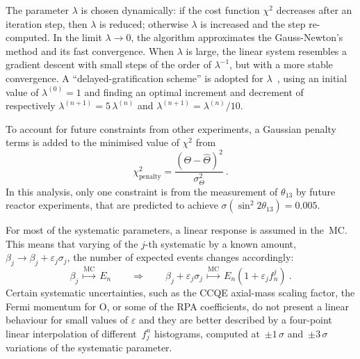 The parameter $\lambda$ is chosen dynamically: if the cost function $\chi^2$ decreases %
after an iteration step, then $\lambda$ is reduced; otherwise $\lambda$ is increased and the step re-computed.
In the limit $\lambda \to 0$, the algorithm approximates the Gauss-Newton's method and its fast convergence.
When $\lambda$ is large, the linear system resembles a gradient descent with small steps of the order of $\lambda^{-1}$, %
but with a more stable convergence.
A ``delayed-gratification scheme'' is adopted for $\lambda$~\cite{Transtrum2012}, using an initial value of $\lambda^{(0)} = 1$ and finding %
an optimal increment and decrement of respectively $\lambda^{(n+1)} = 5\,\lambda^{(n)}$ and $\lambda^{(n+1)} = \lambda^{(n)} / 10$.

To account for future constraints from other experiments, a Gaussian penalty terms is added %
to the minimised value of $\chi^2$ from 
\begin{equation}
	\chi^2_\text{penalty} = \frac{(\Theta - \hat{\Theta})^2}{\sigma_\Theta^2}\ .
\end{equation}
In this analysis, only one constraint is from the measurement of $\theta_{13}$ by future reactor experiments, %
that are predicted to achieve $\sigma(\sin^2 2\theta_{13}) = 0.005$.

For most of the systematic parameters, a linear response is assumed in the~MC.
This means that varying of the $j$-th systematic by a known amount, $\beta_j \to \beta_j + \varepsilon_j\sigma_j$, %
the number of expected events changes accordingly:
\begin{equation}
	\beta_j\ \overset{\scriptstyle \text{MC}}{\longmapsto}\ E_n %
	\qquad \Longrightarrow \qquad %
	\beta_j + \varepsilon_j\sigma_j\ \overset{\text{MC}}{\longmapsto}\ E_n ( 1 + \varepsilon_j f_n ^j )\ .
\end{equation}
Certain systematic uncertainties, such as the CCQE axial-mass scaling factor, the Fermi momentum for O, %
or some of the RPA coefficients, %
do not present a linear behaviour for small values of $\varepsilon$ %
and they are better described by a four-point linear interpolation of different~$f_j^n$ histograms, %
computed at~$\pm1\,\sigma$ and~$\pm3\,\sigma$ variations of the systematic parameter.




